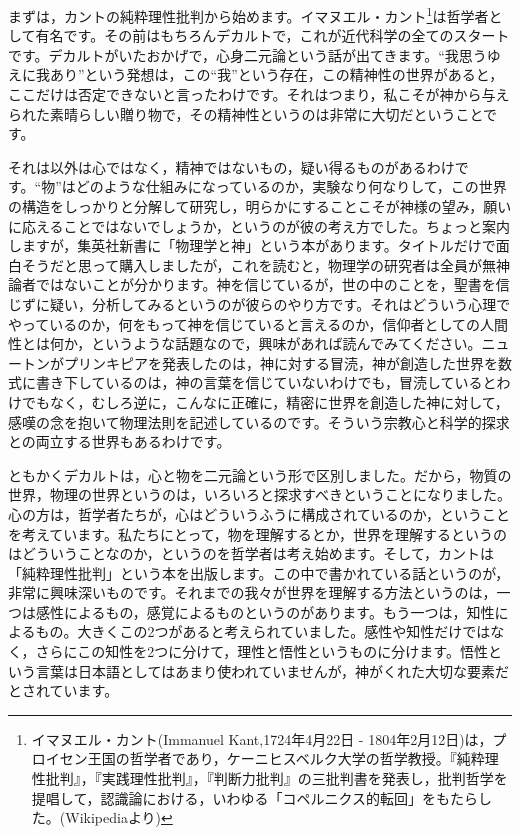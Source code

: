 \documentclass{ltjsbook}
\begin{document}
まずは，カントの純粋理性批判から始めます。イマヌエル・カント\footnote{イマヌエル・カント(Immanuel Kant,1724年4月22日 - 1804年2月12日)は，プロイセン王国の哲学者であり，ケーニヒスベルク大学の哲学教授。『純粋理性批判』，『実践理性批判』，『判断力批判』の三批判書を発表し，批判哲学を提唱して，認識論における，いわゆる「コペルニクス的転回」をもたらした。(Wikipediaより)}は哲学者として有名です。その前はもちろんデカルトで，これが近代科学の全てのスタートです。デカルトがいたおかげで，心身二元論という話が出てきます。``我思うゆえに我あり''という発想は，この``我''という存在，この精神性の世界があると，ここだけは否定できないと言ったわけです。それはつまり，私こそが神から与えられた素晴らしい贈り物で，その精神性というのは非常に大切だということです。

それは以外は心ではなく，精神ではないもの，疑い得るものがあるわけです。``物''はどのような仕組みになっているのか，実験なり何なりして，この世界の構造をしっかりと分解して研究し，明らかにすることこそが神様の望み，願いに応えることではないでしょうか，というのが彼の考え方でした。ちょっと案内しますが，集英社新書に「物理学と神」\parencite{ikeuchi2002}という本があります。タイトルだけで面白そうだと思って購入しましたが，これを読むと，物理学の研究者は全員が無神論者ではないことが分かります。神を信じているが，世の中のことを，聖書を信じずに疑い，分析してみるというのが彼らのやり方です。それはどういう心理でやっているのか，何をもって神を信じていると言えるのか，信仰者としての人間性とは何か，というような話題なので，興味があれば読んでみてください。ニュートンがプリンキピアを発表したのは，神に対する冒涜，神が創造した世界を数式に書き下しているのは，神の言葉を信じていないわけでも，冒涜しているとわけでもなく，むしろ逆に，こんなに正確に，精密に世界を創造した神に対して，感嘆の念を抱いて物理法則を記述しているのです。そういう宗教心と科学的探求との両立する世界もあるわけです。

ともかくデカルトは，心と物を二元論という形で区別しました。だから，物質の世界，物理の世界というのは，いろいろと探求すべきということになりました。心の方は，哲学者たちが，心はどういうふうに構成されているのか，ということを考えています。私たちにとって，物を理解するとか，世界を理解するというのはどういうことなのか，というのを哲学者は考え始めます。そして，カントは「純粋理性批判」\parencite{Kant1961}という本を出版します。この中で書かれている話というのが，非常に興味深いものです。それまでの我々が世界を理解する方法というのは，一つは感性によるもの，感覚によるものというのがあります。もう一つは，知性によるもの。大きくこの2つがあると考えられていました。感性や知性だけではなく，さらにこの知性を2つに分けて，理性と悟性というものに分けます。悟性という言葉は日本語としてはあまり使われていませんが，神がくれた大切な要素だとされています。
\end{document}
